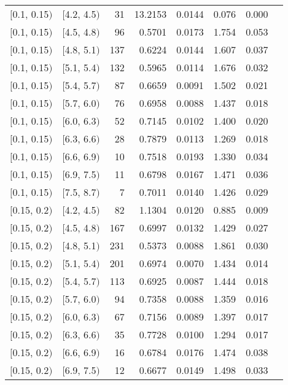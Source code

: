 \begin{longtable}{| l | l | r | r | r | r | r | r |}
        $[$0.1, 0.15$)$ & $[$4.2, 4.5$)$ & 31  & 13.2153& 0.0144 & 0.076 & 0.000 \\
        $[$0.1, 0.15$)$ & $[$4.5, 4.8$)$ & 96  & 0.5701 & 0.0173 & 1.754 & 0.053 \\
        $[$0.1, 0.15$)$ & $[$4.8, 5.1$)$ & 137 & 0.6224 & 0.0144 & 1.607 & 0.037 \\
        $[$0.1, 0.15$)$ & $[$5.1, 5.4$)$ & 132 & 0.5965 & 0.0114 & 1.676 & 0.032 \\
        $[$0.1, 0.15$)$ & $[$5.4, 5.7$)$ & 87  & 0.6659 & 0.0091 & 1.502 & 0.021 \\
        $[$0.1, 0.15$)$ & $[$5.7, 6.0$)$ & 76  & 0.6958 & 0.0088 & 1.437 & 0.018 \\
        $[$0.1, 0.15$)$ & $[$6.0, 6.3$)$ & 52  & 0.7145 & 0.0102 & 1.400 & 0.020 \\
        $[$0.1, 0.15$)$ & $[$6.3, 6.6$)$ & 28  & 0.7879 & 0.0113 & 1.269 & 0.018 \\
        $[$0.1, 0.15$)$ & $[$6.6, 6.9$)$ & 10  & 0.7518 & 0.0193 & 1.330 & 0.034 \\
        $[$0.1, 0.15$)$ & $[$6.9, 7.5$)$ & 11  & 0.6798 & 0.0167 & 1.471 & 0.036 \\
        $[$0.1, 0.15$)$ & $[$7.5, 8.7$)$ & 7   & 0.7011 & 0.0140 & 1.426 & 0.029 \\
        $[$0.15, 0.2$)$ & $[$4.2, 4.5$)$ & 82  & 1.1304 & 0.0120 & 0.885 & 0.009 \\
        $[$0.15, 0.2$)$ & $[$4.5, 4.8$)$ & 167 & 0.6997 & 0.0132 & 1.429 & 0.027 \\
        $[$0.15, 0.2$)$ & $[$4.8, 5.1$)$ & 231 & 0.5373 & 0.0088 & 1.861 & 0.030 \\
        $[$0.15, 0.2$)$ & $[$5.1, 5.4$)$ & 201 & 0.6974 & 0.0070 & 1.434 & 0.014 \\
        $[$0.15, 0.2$)$ & $[$5.4, 5.7$)$ & 113 & 0.6925 & 0.0087 & 1.444 & 0.018 \\
        $[$0.15, 0.2$)$ & $[$5.7, 6.0$)$ & 94  & 0.7358 & 0.0088 & 1.359 & 0.016 \\
        $[$0.15, 0.2$)$ & $[$6.0, 6.3$)$ & 67  & 0.7156 & 0.0089 & 1.397 & 0.017 \\
        $[$0.15, 0.2$)$ & $[$6.3, 6.6$)$ & 35  & 0.7728 & 0.0100 & 1.294 & 0.017 \\
        $[$0.15, 0.2$)$ & $[$6.6, 6.9$)$ & 16  & 0.6784 & 0.0176 & 1.474 & 0.038 \\
        $[$0.15, 0.2$)$ & $[$6.9, 7.5$)$ & 12  & 0.6677 & 0.0149 & 1.498 & 0.033 \\

\end{longtable}
